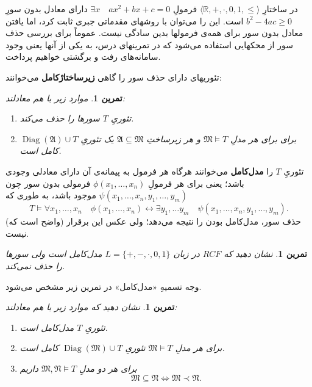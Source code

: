 \documentclass[12pt,a4paper]{article}
\theoremstyle{colorhead}
\newtheorem{tam}[thm]{تمرین}
\DeclareMathOperator{\diag}{Diag}
\begin{document}
در ساختارِ
$\langle \mathbb{R},+,\cdot,0,1,\leq\rangle$
 فرمولِ
 $\exists x\quad ax^2+bx+c=0$
 دارای معادل بدون سورِ
 $b^2-4ac\geq 0$
 است. این را می‌توان با روشهای مقدماتی جبری ثابت کرد، اما یافتن معادل بدون سور برای همه‌ی فرمولها بدین سادگی نیست. عموماً برای بررسی حذف سور از محکهایی استفاده می‌شود که در تمرینهای درس، به یکی از آنها یعنی وجود سامانه‌های رفت و برگشتی خواهیم پرداخت. 
 \par 
 تئوریهای دارای حذف سور را گاهی 
\textbf{زیرساختارْکامل}
 می‌خوانند:
 \begin{tam}
موارد زیر با هم معادلند:
 \begin{enumerate}
 \item 
  تئوریِ
  $T$
  سورها را حذف می‌کند.
 \item 
 $\diag(\mathfrak{A})\cup T$
 برای 
 برای هر مدلِ
 $\mathfrak{M}\models T$
 و هر زیرساختِ
  $\mathfrak{A}\subseteq \mathfrak{M}$
  یک تئوریِ
  کامل است. 	
 \end{enumerate}
 \end{tam}
تئوریِ
$T$
را 
\textbf{مدل‌کامل}
 می‌خوانند هرگاه هر فرمول به پیمانه‌ی آن دارای معادلی وجودی باشد؛ یعنی برای هر فرمولِ
$\phi(x_1,\ldots,x_n)$
فرمولی 
بدون سور چون
$\psi(x_1,\ldots,x_n,y_1,\ldots,y_m)$
موجود 
باشد، به طوری که
\[
T\models \forall x_1,\ldots,x_n \quad \phi(x_1,\ldots,x_n)\leftrightarrow \exists y_1,\ldots y_m \quad \psi(x_1,\ldots,x_n,y_1,\ldots,y_m).
\]
(واضح است که)
   حذف
   سور، مدل‌کامل بودن را نتیجه می‌دهد؛ ولی عکس این برقرار نیست.
   \begin{tam}
   نشان دهید که 
   $RCF$
   در زبان
   $L=\{+,-,\cdot,0,1\}$
    مدل‌کامل است ولی سورها را حذف نمی‌کند.
   \end{tam}
وجه تسمیهِ «مدل‌کامل» در تمرین زیر مشخص می‌شود.
  \begin{tam}
  نشان دهید که موارد زیر با هم معادلند:
  \begin{enumerate}
  \item 
  تئوریِ
  $T$
  مدل‌کامل
  است.
  \item 
  برای هر مدلِ
  $\mathfrak{M}\models T$
       تئوریِ
       $\diag(\mathfrak{M})\cup T$
        کامل 
        است.
  \item 
  برای هر دو مدلِ
  $\mathfrak{M},\mathfrak{N}\models T$
  داریم
  \[
  \mathfrak{M}\subseteq \mathfrak{N}\Leftrightarrow \mathfrak{M}\prec \mathfrak{N}.
  \]
  \end{enumerate}
  \end{tam}
\pagebreak
\end{document}
